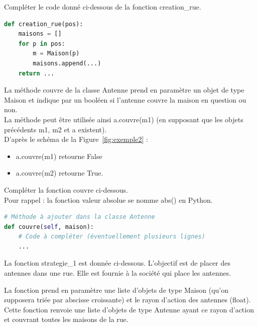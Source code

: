 \documentclass[a4paper, noanswers, addpoints, 12pt]{exam}
\begin{document}
\begin{questions}
\vfill
\question[2] Compléter le code donné ci-dessous de la fonction creation\_rue.
\begin{lstlisting}[language=Python]
def creation_rue(pos):
    maisons = []
    for p in pos:
        m = Maison(p)
        maisons.append(...)
    return ...
\end{lstlisting}

\vfill
La méthode couvre de la classe Antenne prend en paramètre un objet de type Maison et indique par un booléen si l'antenne couvre la maison en question ou non.\\

La méthode peut être utilisée ainsi a.couvre(m1) (en supposant que les objets précédents m1, m2 et a existent).\\
D'après le schéma de la Figure~\ref{fig:exemple2} :
\begin{itemize}
    \item a.couvre(m1) retourne False
    \item a.couvre(m2) retourne True.
\end{itemize}

\question[2] Compléter la fonction couvre ci-dessous.\\
Pour rappel : la fonction valeur absolue se nomme abs() en Python.

\begin{lstlisting}[language=Python]
# Méthode à ajouter dans la classe Antenne
def couvre(self, maison):
    # Code à compléter (éventuellement plusieurs lignes)
    ...
\end{lstlisting}

\pagebreak
La fonction strategie\_1 est donnée ci-dessous. L'objectif est de placer des antennes dans une rue. Elle est fournie à la société qui place les antennes.

La fonction prend en paramètre une liste d'objets de type Maison (qu'on supposera triée par abscisse croissante) et le rayon d'action des antennes (float). Cette fonction renvoie une liste d'objets de type Antenne ayant ce rayon d'action et couvrant toutes les maisons de la rue.


\end{questions}
\end{document}
